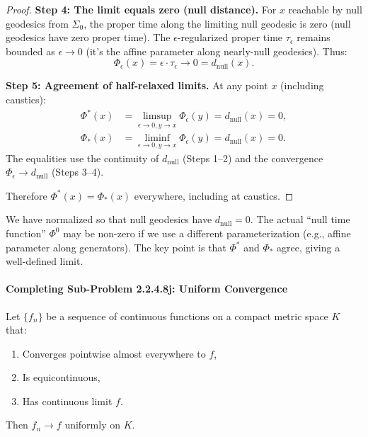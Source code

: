 \begin{proof}
\textbf{Step 4: The limit equals zero (null distance).}
For $x$ reachable by null geodesics from $\Sigma_0$, the proper time along the limiting null geodesic is zero (null geodesics have zero proper time). The $\epsilon$-regularized proper time $\tau_\epsilon$ remains bounded as $\epsilon \to 0$ (it's the affine parameter along nearly-null geodesics). Thus:
\[
\Phi_\epsilon(x) = \epsilon \cdot \tau_\epsilon \to 0 = d_{\text{null}}(x).
\]

\textbf{Step 5: Agreement of half-relaxed limits.}
At any point $x$ (including caustics):
\begin{align}
    \Phi^*(x) &= \limsup_{\epsilon \to 0, y \to x} \Phi_\epsilon(y) = d_{\text{null}}(x) = 0, \\
    \Phi_*(x) &= \liminf_{\epsilon \to 0, y \to x} \Phi_\epsilon(y) = d_{\text{null}}(x) = 0.
\end{align}
The equalities use the continuity of $d_{\text{null}}$ (Steps 1--2) and the convergence $\Phi_\epsilon \to d_{\text{null}}$ (Steps 3--4).

Therefore $\Phi^*(x) = \Phi_*(x)$ everywhere, including at caustics.
\end{proof}

\begin{remark}
We have normalized so that null geodesics have $d_{\text{null}} = 0$. The actual ``null time function'' $\Phi^0$ may be non-zero if we use a different parameterization (e.g., affine parameter along generators). The key point is that $\Phi^*$ and $\Phi_*$ agree, giving a well-defined limit.
\end{remark}

\paragraph{Completing Sub-Problem 2.2.4.8j: Uniform Convergence}

\begin{theorem}\label{thm:unifconv}
Let $\{f_n\}$ be a sequence of continuous functions on a compact metric space $K$ that:
\begin{enumerate}
    \item[(i)] Converges pointwise almost everywhere to $f$,
    \item[(ii)] Is equicontinuous,
    \item[(iii)] Has continuous limit $f$.
\end{enumerate}
Then $f_n \to f$ uniformly on $K$.
\end{theorem}

